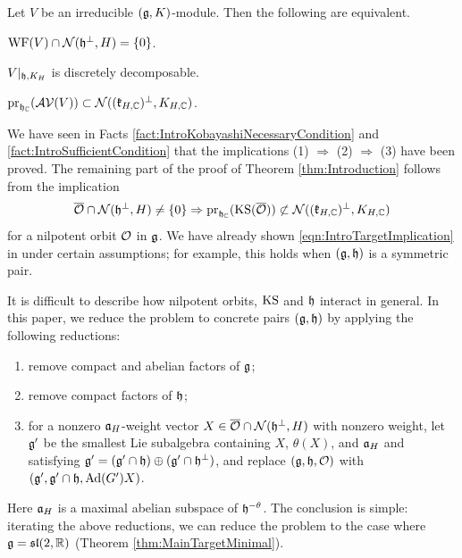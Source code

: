 \begin{theorem} \label{thm:Introduction}
	Let $V$ be an irreducible $(\mathfrak{g}, K)$-module.
	Then the following are equivalent.
	\begin{enumparen}
		\item $\mathrm{WF}(V)\cap \mathcal{N}(\mathfrak{h}^\perp, H) = \left\{0 \right\}$.
		\item $V|_{\mathfrak{h}, K_H}$ is discretely decomposable.
		\item $\mathrm{pr}_{\mathfrak{h}_{\mathbb{C}}}(\mathcal{AV}(V)) \subset \mathcal{N}((\mathfrak{k}_{H, \mathbb{C}})^\perp, K_{H, \mathbb{C}})$.
	\end{enumparen}
\end{theorem}

We have seen in Facts \ref{fact:IntroKobayashiNecessaryCondition} and \ref{fact:IntroSufficientCondition} that the implications (1) $\Rightarrow$ (2) $\Rightarrow$ (3) have been proved.
The remaining part of the proof of Theorem \ref{thm:Introduction} follows from the implication
\begin{align}
	\overline{\mathcal{O}} \cap \mathcal{N}(\mathfrak{h}^\perp, H) \neq \left\{0 \right\} \Rightarrow \mathrm{pr}_{\mathfrak{h}_{\mathbb{C}}}(\mathrm{KS}(\overline{\mathcal{O}})) \not\subset \mathcal{N}((\mathfrak{k}_{H, \mathbb{C}})^\perp, K_{H, \mathbb{C}}) \label{eqn:IntroTargetImplication}
\end{align}
for a nilpotent orbit $\mathcal{O}$ in $\mathfrak{g}$.
We have already shown \eqref{eqn:IntroTargetImplication} in \cite[Theorem 21]{Ki24} under certain assumptions; for example, this holds when $(\mathfrak{g}, \mathfrak{h})$ is a symmetric pair.

It is difficult to describe how nilpotent orbits, $\mathrm{KS}$ and $\mathfrak{h}$ interact in general.
In this paper, we reduce the problem to concrete pairs $(\mathfrak{g},\mathfrak{h})$ by applying the following reductions:
\begin{enumerate}[label=(R\arabic*)]
	\item remove compact and abelian factors of $\mathfrak{g}$;
	\item remove compact factors of $\mathfrak{h}$;
	\item for a nonzero $\mathfrak{a}_H$-weight vector $X\in \overline{\mathcal{O}} \cap \mathcal{N}(\mathfrak{h}^\perp, H)$ with nonzero weight, let $\mathfrak{g}'$ be the smallest Lie subalgebra containing $X$, $\theta(X)$, and $\mathfrak{a}_H$ and satisfying $\mathfrak{g}'=(\mathfrak{g}'\cap\mathfrak{h})\oplus(\mathfrak{g}'\cap \mathfrak{h}^\perp)$, and replace $(\mathfrak{g}, \mathfrak{h}, \mathcal{O})$ with $(\mathfrak{g}', \mathfrak{g}'\cap\mathfrak{h}, \mathrm{Ad}(G')X)$.
\end{enumerate}
Here $\mathfrak{a}_H$ is a maximal abelian subspace of $\mathfrak{h}^{-\theta}$.
The conclusion is simple: iterating the above reductions, we can reduce the problem to the case where $\mathfrak{g} = \mathfrak{sl}(2,\mathbb{R})$ (Theorem \ref{thm:MainTargetMinimal}).

